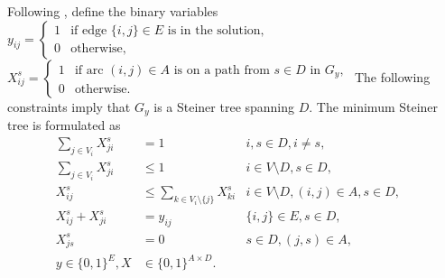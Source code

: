 Following \cite{Haugland12Dual}, define the binary variables
\newline\newline
$y_{ij}=
\begin{cases}
    1 & \text{if edge $\{i,j\} \in E$ is in the solution},\\
    0 & \text{otherwise},
  \end{cases}$
\newline\newline
$X^{s}_{ij}=
\begin{cases}
    1 & \text{if arc $(i,j) \in A$ is on a path from $s\in D$ in $G_y$},\\
    0 & \text{otherwise}.
  \end{cases}$
\newline\newline
The following constraints imply that $G_y$ is a Steiner tree spanning $D$.
The minimum Steiner tree is formulated as
\begin{subequations}\label{mod:x0}
\begin{align}
\label{con:dd:arrowFromDest} \sum\limits_{j\in V_i}X^s_{ji} & = 1 & i,s\in D,i\neq s,\\
\label{con:dd:arrowFromNonDestB} \sum\limits_{j\in V_{i}}X^s_{ji} & \leq 1 & i\in V \setminus D, s\in D,\\
\label{con:dd:arrowFromNonDestA} X^s_{ij} & \leq \sum\limits_{k\in V_{i}\setminus \{j\}}X^s_{ki} & i\in V \setminus D,(i,j)\in A, s\in D,\\
\label{con:dd:oneDir} X^s_{ij} + X^s_{ji} & = y_{ij} & \{i,j\}\in E, s\in D,\\
\label{con:dd:startInSource} X^s_{js} & = 0 &  s\in D, (j,s)\in A,&\\
\label{con:dd:vardim}y \in \{0,1\}^{E}, X & \in \{0,1\}^{A\times D}.
\end{align}~
\end{subequations}

